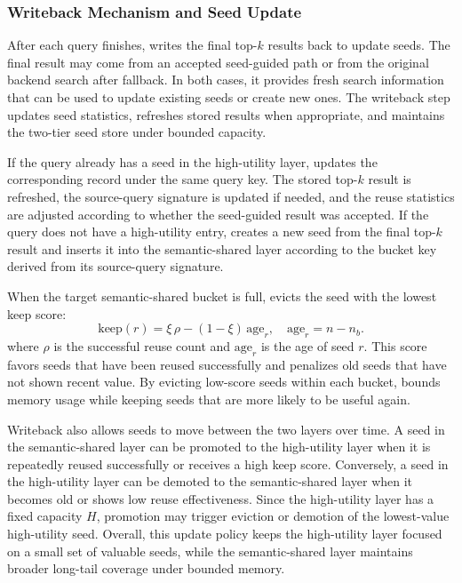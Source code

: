 \subsubsection{Writeback Mechanism and Seed Update}

After each query finishes, \system writes the final top-$k$ results back to update seeds. 
The final result may come from an accepted seed-guided path or from the original backend search after fallback.
In both cases, it provides fresh search information that can be used to update existing seeds or create new ones.
The writeback step updates seed statistics, refreshes stored results when appropriate, and maintains the two-tier seed store under bounded capacity.

If the query already has a seed in the high-utility layer, \system updates the corresponding record under the same query key.
The stored top-$k$ result is refreshed, the source-query signature is updated if needed, and the reuse statistics are adjusted according to whether the seed-guided result was accepted.
If the query does not have a high-utility entry, \system creates a new seed from the final top-$k$ result and inserts it into the semantic-shared layer according to the bucket key derived from its source-query signature.

When the target semantic-shared bucket is full, \system evicts the seed with the lowest keep score:
\begin{equation}
\mathrm{keep}(r)=\xi\,\rho-(1-\xi)\,\mathrm{age}_r, \quad \mathrm{age}_r=n-n_b.
\end{equation}
where $\rho$ is the successful reuse count and $\mathrm{age}_r$ is the age of seed $r$.
This score favors seeds that have been reused successfully and penalizes old seeds that have not shown recent value.
By evicting low-score seeds within each bucket, \system bounds memory usage while keeping seeds that are more likely to be useful again.

Writeback also allows seeds to move between the two layers over time.
A seed in the semantic-shared layer can be promoted to the high-utility layer when it is repeatedly reused successfully or receives a high keep score.
Conversely, a seed in the high-utility layer can be demoted to the semantic-shared layer when it becomes old or shows low reuse effectiveness.
Since the high-utility layer has a fixed capacity $H$, promotion may trigger eviction or demotion of the lowest-value high-utility seed.
Overall, this update policy keeps the high-utility layer focused on a small set of valuable seeds, while the semantic-shared layer maintains broader long-tail coverage under bounded memory.


